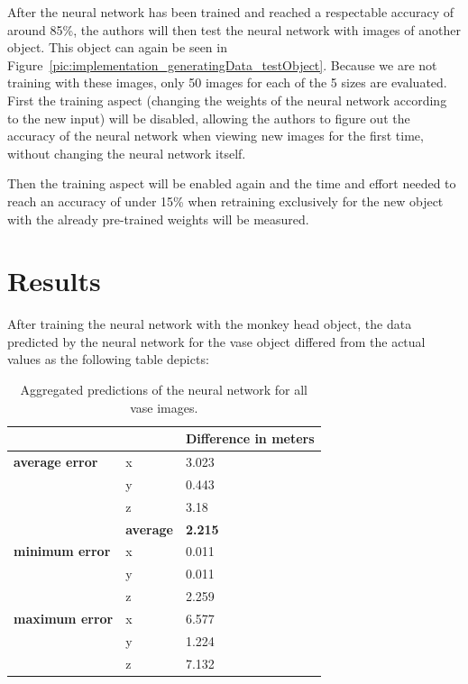 After the neural network has been trained and reached a respectable accuracy of around 85\%, the authors will then test the neural network with images of another object. This object can again be seen in Figure~\ref{pic:implementation_generatingData_testObject}. Because we are not training with these images, only 50 images for each of the 5 sizes are evaluated. First the training aspect (changing the weights of the neural network according to the new input) will be disabled, allowing the authors to figure out the accuracy of the neural network when viewing new images for the first time, without changing the neural network itself.

Then the training aspect will be enabled again and the time and effort needed to reach an accuracy of under 15\% when retraining exclusively for the new object with the already pre-trained weights will be measured.

\section{Results}
After training the neural network with the monkey head object, the data predicted by the neural network for the vase object differed from the actual values as the following table depicts:

\begin{table}[h!]
	\begin{tabular}{ll|l}
		&     & \textbf{Difference in meters} \\
		\hline
		\textbf{average error} & x   & 3.023                         \\
		& y   & 0.443                         \\
		& z   & 3.18                          \\
		& \textbf{average} & \textbf{2.215}                         \\
		\hline
		\textbf{minimum error} & x   & 0.011                         \\
		& y   & 0.011                         \\
		& z   & 2.259                         \\
		\hline
		\textbf{maximum error} & x   & 6.577                         \\
		& y   & 1.224                         \\
		& z   & 7.132                                                  
	\end{tabular}
	\caption{Aggregated predictions of the neural network for all vase images.}
\end{table}

